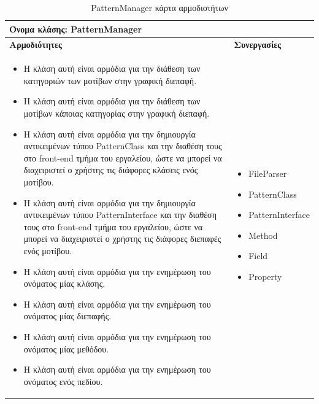 \begin{table}[H]
    \centering
    \begin{tabular}{|p{10cm}|p{5cm}|}
        \hline
        \multicolumn{2}{|l|}{Όνομα κλάσης: PatternManager} \\
        \hline
        \textbf{Αρμοδιότητες} & \textbf{Συνεργασίες} \\
        \hline
        \begin{itemize}
            \item Η κλάση αυτή είναι αρμόδια για την διάθεση των κατηγοριών των μοτίβων στην γραφική διεπαφή.
            \item Η κλάση αυτή είναι αρμόδια για την διάθεση των μοτίβων κάποιας κατηγορίας στην γραφική διεπαφή.
            \item Η κλάση αυτή είναι αρμόδια για την δημιουργία αντικειμένων τύπου PatternClass και την διαθέση τους στο front-end τμήμα του 
            εργαλείου, ώστε να μπορεί να διαχειριστεί ο χρήστης τις διάφορες κλάσεις ενός μοτίβου.
            \item Η κλάση αυτή είναι αρμόδια για την δημιουργία αντικειμένων τύπου PatternInterface και την διαθέση τους στο front-end τμήμα του 
            εργαλείου, ώστε να μπορεί να διαχειριστεί ο χρήστης τις διάφορες διεπαφές ενός μοτίβου.
            \item Η κλάση αυτή είναι αρμόδια για την ενημέρωση του ονόματος μίας κλάσης.
            \item Η κλάση αυτή είναι αρμόδια για την ενημέρωση του ονόματος μίας διεπαφής.
            \item Η κλάση αυτή είναι αρμόδια για την ενημέρωση του ονόματος μίας μεθόδου.
            \item Η κλάση αυτή είναι αρμόδια για την ενημέρωση του ονόματος ενός πεδίου.
        \end{itemize} &   
        \begin{itemize}
            \item FileParser
            \item PatternClass
            \item PatternInterface
            \item Method
            \item Field
            \item Property
        \end{itemize} \\
        \hline
    \end{tabular}
    \label{tab:PatternManagerCRC}
    \caption{PatternManager κάρτα αρμοδιοτήτων}
\end{table}
